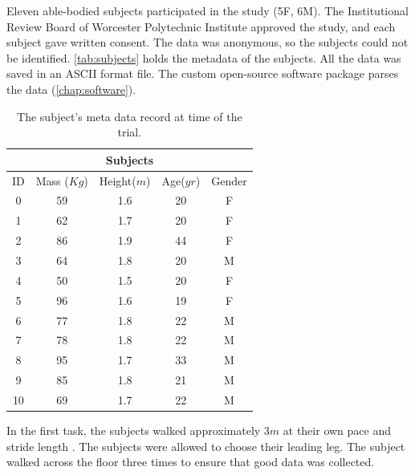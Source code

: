 
Eleven able-bodied subjects participated in the study (5F, 6M). The Institutional Review Board of Worcester Polytechnic Institute approved the study, and each subject gave written consent. The data was anonymous, so the subjects could not be identified. \autoref{tab:subjects} holds the metadata of the subjects. All the data was saved in an ASCII format file. The custom open-source software package parses the data (\autoref{chap:software}).

\begin{table}[h!]
\centering
 \begin{tabular}{|c c c c c|} 
 \hline 
 \multicolumn{5}{|c|}{Subjects} \\
 \hline
 ID & Mass ($Kg$) &  Height($m$)  & Age($yr$)  & Gender \\ [0.5ex] 
 \hline\hline
 0 & 59 & 1.6 & 20 & F \\
 \hline
 1 & 62 & 1.7 & 20 & F \\ 
 \hline
 2 & 86 & 1.9 & 44 & F \\
 \hline
 3 & 64 & 1.8 & 20 & M \\ 
 \hline
 4 & 50 & 1.5 & 20 & F \\
 \hline
 5 & 96 & 1.6 &  19 & F\\
 \hline
 6 & 77 & 1.8 & 22 & M \\
 \hline
 7 & 78 & 1.8 & 22 & M \\
 \hline
 8 & 95 & 1.7 & 33 & M \\
 \hline
 9 & 85 & 1.8 & 21 & M \\
 \hline
 10 & 69 & 1.7 & 22 & M \\[1ex] 
 \hline
\end{tabular}
\caption[Subject Table]{The subject's meta data record at time of the trial.}
\label{tab:subjects}
\end{table}



 In the first task, the subjects walked approximately 3$m$ at their own pace and stride length \cite{peters2014concurrent}. The subjects were allowed to choose their leading leg. The subject walked across the floor three times to ensure that good data was collected. 

